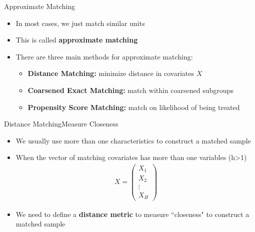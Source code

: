 \documentclass[hyperref={pdfpagelabels=false}]{beamer}
\begin{document}
\begin{frame}{Approximate Matching}{}
	\begin{itemize}
		
		\item In most cases, we just match similar units 
		\vspace{0.2cm}	
		\item This is called \textbf{approximate matching}
		\vspace{0.2cm}	
		\item There are three main methods for approximate matching:
				\vspace{0.2cm}	
		\begin{itemize}
			\item[1] \textbf{Distance Matching:} minimize distance in covariates $X$
			\vspace{0.2cm}
			\item[2] \textbf{Coarsened Exact Matching:}	match within coarsened subgroups
			\vspace{0.2cm}
			\item[3] \textbf{Propensity Score Matching:} match on likelihood of being treated
						
		\end{itemize}
	\end{itemize}
\end{frame}








\begin{frame}{Distance Matching}{Measure Closeness}
\begin{itemize}
	
\item We usually use more than one characteristics to construct a matched sample
\vspace{0.2cm}	
\item When the vector of matching covariates has more than one variables (h>1) 
	\begin{align*}
	X=\left(
	\begin{array}{c}
	X_1\\X_2\\\vdots\\X_H
	\end{array}\right)
	\end{align*}

\item We need to define a \textbf{distance metric} to measure ``closeness" to construct a matched sample


\end{itemize}
\end{frame}
\end{document}
